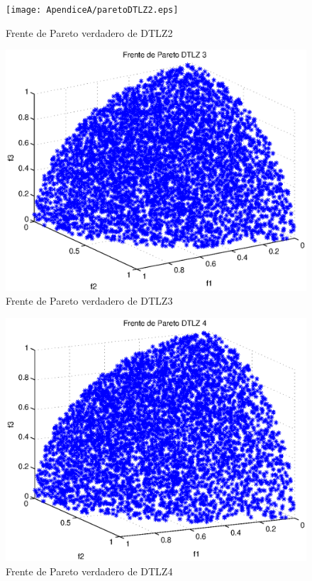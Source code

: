 \begin{figure}
    \centering
    \texttt{[image: ApendiceA/paretoDTLZ2.eps]}
    \caption{Frente de Pareto verdadero de DTLZ2}
    \label{fig:dtlz2}
\end{figure}
\begin{figure}
    \centering
    \includegraphics[scale=0.7]{ApendiceA/paretoDTLZ3.eps}
    \caption{Frente de Pareto verdadero de DTLZ3}
    \label{fig:dtlz3}
\end{figure}
\begin{figure}
    \centering
    \includegraphics[scale=0.7]{ApendiceA/paretoDTLZ4.eps}
    \caption{Frente de Pareto verdadero de DTLZ4}
    \label{fig:dtlz4}
\end{figure}
